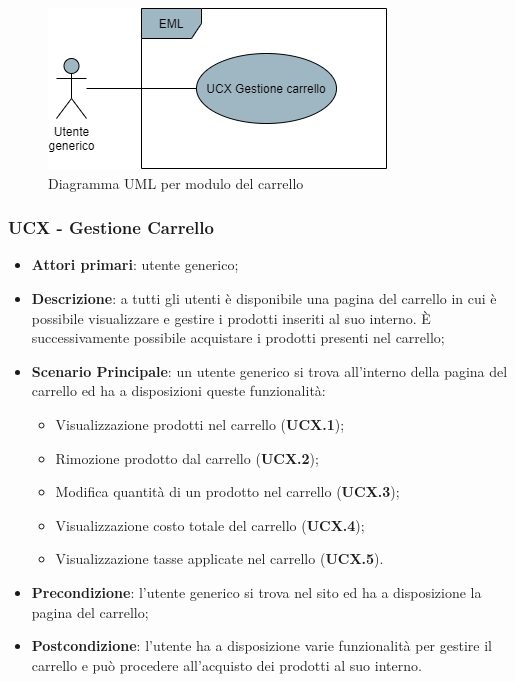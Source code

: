 \begin{figure}[H]
\centering
\includegraphics[scale=0.6]{res/UseCase/Immagini/CarrelloGenerale}
\caption{Diagramma UML per modulo del carrello}
\end{figure}

\subsubsection{UCX - Gestione Carrello}
\begin{itemize}
\item \textbf{Attori primari}: utente generico;
\item \textbf{Descrizione}: a tutti gli utenti è disponibile una pagina del carrello in cui è possibile visualizzare e gestire i prodotti inseriti al suo interno. È successivamente possibile acquistare i prodotti presenti nel carrello;
\item \textbf{Scenario Principale}: un utente generico si trova all'interno della pagina del carrello ed ha a disposizioni queste funzionalità:
\begin{itemize}
\item Visualizzazione prodotti nel carrello (\textbf{UCX.1});
\item Rimozione prodotto dal carrello (\textbf{UCX.2});
\item Modifica quantità di un prodotto nel carrello (\textbf{UCX.3});
\item Visualizzazione costo totale del carrello (\textbf{UCX.4});
\item Visualizzazione tasse applicate nel carrello (\textbf{UCX.5}).
\end{itemize}
\item \textbf{Precondizione}: l'utente generico si trova nel sito ed ha a disposizione la pagina del carrello;
\item \textbf{Postcondizione}: l'utente ha a disposizione varie funzionalità per gestire il carrello e può procedere all'acquisto dei prodotti al suo interno.
\end{itemize}

